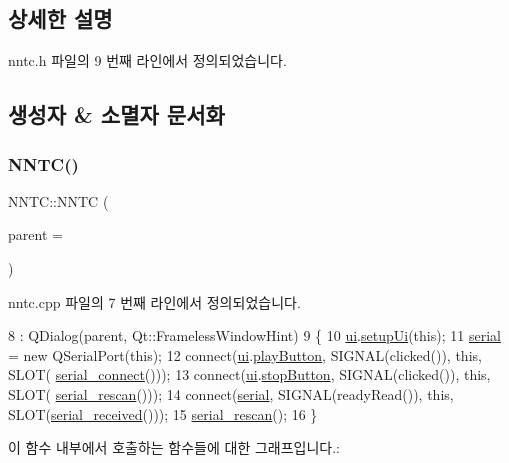 \subsection{상세한 설명}


nntc.\+h 파일의 9 번째 라인에서 정의되었습니다.



\subsection{생성자 \& 소멸자 문서화}
\mbox{\label{class_n_n_t_c_a6b610d14cbd1da9f70d6aafb8f8f630a}} 
\subsubsection{\texorpdfstring{N\+N\+T\+C()}{NNTC()}}
{\footnotesize\ttfamily N\+N\+T\+C\+::\+N\+N\+TC (\begin{DoxyParamCaption}\item[{Q\+Widget $\ast$}]{parent = {} }\end{DoxyParamCaption})\hspace{0.3cm}{\ttfamily [explicit]}}



nntc.\+cpp 파일의 7 번째 라인에서 정의되었습니다.


\begin{DoxyCode}
8     : QDialog(parent, Qt::FramelessWindowHint)
9 \{
10     \mbox{\hyperlink{class_n_n_t_c_aafbe297818dd00b2c0f791ebb06292a4}{ui}}.\mbox{\hyperlink{class_ui___n_n_t_c_class_af15085afc5bdbefb529321782b509792}{setupUi}}(\textcolor{keyword}{this});
11     \mbox{\hyperlink{nntc_8cpp_ae6fc1d9226a3b8046c907909a550dbe7}{serial}} = \textcolor{keyword}{new} QSerialPort(\textcolor{keyword}{this});
12     connect(\mbox{\hyperlink{class_n_n_t_c_aafbe297818dd00b2c0f791ebb06292a4}{ui}}.\mbox{\hyperlink{class_ui___n_n_t_c_class_a6e604f467f5d7264f8d23f0cf54a6fdf}{playButton}}, SIGNAL(clicked()), \textcolor{keyword}{this}, SLOT(
      \mbox{\hyperlink{class_n_n_t_c_ae9613ae3c1668e30610e0104e8e53d40}{serial\_connect}}()));
13     connect(\mbox{\hyperlink{class_n_n_t_c_aafbe297818dd00b2c0f791ebb06292a4}{ui}}.\mbox{\hyperlink{class_ui___n_n_t_c_class_a748e190a62458531e66a574cc556e32d}{stopButton}}, SIGNAL(clicked()), \textcolor{keyword}{this}, SLOT(
      \mbox{\hyperlink{class_n_n_t_c_a5c1cdbe97b81d19b31ff07e9ca413be2}{serial\_rescan}}()));
14     connect(\mbox{\hyperlink{nntc_8cpp_ae6fc1d9226a3b8046c907909a550dbe7}{serial}}, SIGNAL(readyRead()), \textcolor{keyword}{this}, SLOT(\mbox{\hyperlink{class_n_n_t_c_a2064774e2931ebb77e62bbd5115c0589}{serial\_received}}()));
15     \mbox{\hyperlink{class_n_n_t_c_a5c1cdbe97b81d19b31ff07e9ca413be2}{serial\_rescan}}();
16 \}
\end{DoxyCode}
이 함수 내부에서 호출하는 함수들에 대한 그래프입니다.\+:
\mbox{\label{class_n_n_t_c_a36e06f71df0bfcbeb932f34c5986801a}} 

